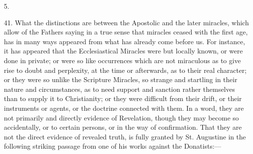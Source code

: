 5.

41.
What the distinctions are between the Apostolic and the later
miracles, which allow of the Fathers saying in a true sense that
miracles ceased with the first age, has in many ways appeared from
what has already come before us. For instance, it has appeared that
the Ecclesiastical Miracles were but locally known, or were done in
private; or were so like occurrences which are not miraculous as to
give rise to doubt and perplexity, at the time or afterwards, as
to their real character; or they were so unlike the Scripture
Miracles, so strange and startling in their nature and circumstances,
as to need support and sanction rather themselves than to supply it to
Christianity; or they were difficult from their drift, or their
instruments or agents, or the doctrine connected with them. In a word,
they are not primarily and directly evidence of Revelation, though
they may become so accidentally, or to certain persons, or in
the way of confirmation. That they are not the direct evidence of
revealed truth, is fully granted by St. Augustine in the following
striking passage from one of his works against the Donatists:—

